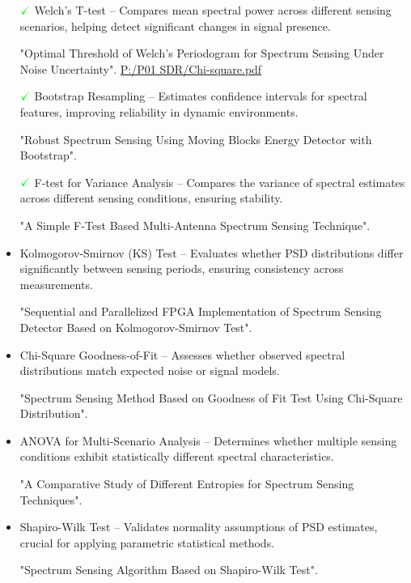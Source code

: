 \documentclass[10pt]{report}
\begin{document}
\begin{itemize}
 
 \item[$\color{green} {\checkmark}$] Welch’s T-test – Compares mean spectral power across different sensing scenarios, helping detect significant changes in signal presence.
 
 "Optimal Threshold of Welch’s Periodogram for Spectrum Sensing Under Noise Uncertainty".	\url{P:/P01 SDR/Chi-square.pdf}
 \item[$\color{green} {\checkmark}$] Bootstrap Resampling – Estimates confidence intervals for spectral features, improving reliability in dynamic environments.
 
 "Robust Spectrum Sensing Using Moving Blocks Energy Detector with Bootstrap".
 \item[$\color{green} {\checkmark}$] F-test for Variance Analysis – Compares the variance of spectral estimates across different sensing conditions, ensuring stability.
 
 "A Simple F-Test Based Multi-Antenna Spectrum Sensing Technique".
 \item Kolmogorov-Smirnov (KS) Test – Evaluates whether PSD distributions differ significantly between sensing periods, ensuring consistency across measurements.
 
 "Sequential and Parallelized FPGA Implementation of Spectrum Sensing Detector Based on Kolmogorov-Smirnov Test".
 \item Chi-Square Goodness-of-Fit – Assesses whether observed spectral distributions match expected noise or signal models.

"Spectrum Sensing Method Based on Goodness of Fit Test Using Chi-Square Distribution".
 \item ANOVA for Multi-Scenario Analysis – Determines whether multiple sensing conditions exhibit statistically different spectral characteristics.

"A Comparative Study of Different Entropies for Spectrum Sensing Techniques".
 \item Shapiro-Wilk Test – Validates normality assumptions of PSD estimates, crucial for applying parametric statistical methods.

"Spectrum Sensing Algorithm Based on Shapiro-Wilk Test".
\end{itemize}
\end{document}
